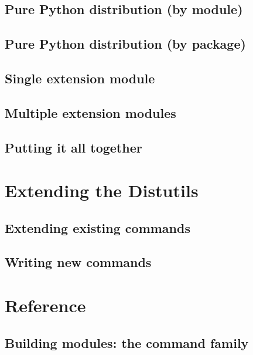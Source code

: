 \documentclass{howto}
\begin{document}
\subsection{Pure Python distribution (by module)}
\label{pure-mod}


\subsection{Pure Python distribution (by package)}
\label{pure-pkg}


\subsection{Single extension module}
\label{single-ext}


\subsection{Multiple extension modules}
\label{multiple-ext}


\subsection{Putting it all together}



\section{Extending the Distutils}
\label{extending}


\subsection{Extending existing commands}
\label{extend-existing}


\subsection{Writing new commands}
\label{new-commands}



\section{Reference}
\label{reference}


\subsection{Building modules: the \protect{} command family}
\label{build-cmds}
\end{document}
